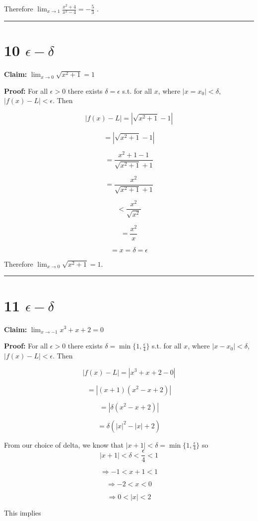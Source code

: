 \documentclass[10pt,letterpaper]{article}
\newcommand\ds{\displaystyle}
\newcommand\qedsym{\hfill \rule{2mm}{2mm}}
\begin{document}
Therefore $\ds\lim_{x\to 1}\frac{x^2+4}{x^2-4} = -\frac{5}{3}$ .

\qedsym

\section*{10 $\epsilon - \delta$}

\textbf{Claim:} $\ds\lim_{x\to 0} \sqrt{x^2 + 1} = 1$

\medskip

\textbf{Proof:} For all $\epsilon > 0$ there exists $\delta = \epsilon$ s.t. for all $x$, where $|x=x_0| < \delta$, $|f(x)-L|<\epsilon$. Then

\[|f(x)-L|=\left|\sqrt{x^2+1}-1\right|\]

\[=\left|\sqrt{x^2+1}-1\right|\]

\[=\frac{x^2+1-1}{\sqrt{x^2+1}+1}\]

\[=\frac{x^2}{\sqrt{x^2+1}+1}\]

\[<\frac{x^2}{\sqrt{x^2}}\]

\[=\frac{x^2}{x}\]

\[=x=\delta=\epsilon\]

Therefore $\ds\lim_{x\to 0} \sqrt{x^2 + 1} = 1$. 

\qedsym

\section*{11 $\epsilon - \delta$}

\textbf{Claim:} $\ds\lim_{x\to -1} x^3 + x + 2 = 0$

\medskip

\textbf{Proof:} For all $\epsilon > 0$ there exists $\delta = \min\{1, \frac{\epsilon}{4}\}$ s.t. for all $x$, where $|x-x_0|<\delta$, $|f(x)-L|<\epsilon$. Then

\[|f(x)-L| = |x^3 + x + 2 - 0|\]

\[=|(x+1)(x^2-x+2)|\]

\[=|\delta (x^2-x+2)|\]

\[=\delta (|x|^2 - |x| + 2)\]

From our choice of delta, we know that $|x+1|<\delta=\min\{1, \frac{\epsilon}{4}\}$ so \[|x+1|<\delta < \frac{\epsilon}{4} < 1\]

\[\Rightarrow -1 < x+1 < 1\]

\[\Rightarrow -2 < x < 0\]

\[\Rightarrow 0 < |x| < 2\]

This implies 
\end{document}

